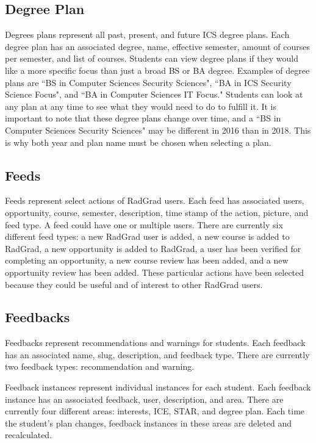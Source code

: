 \subsection{Degree Plan}
Degrees plans represent all past, present, and future ICS degree plans. Each degree plan has an associated degree, name, effective semester, amount of courses per semester, and list of courses. Students can view degree plans if they would like a more specific focus than just a broad BS or BA degree. Examples of degree plans are ``BS in Computer Sciences Security Sciences", ``BA in ICS Security Science Focus", and ``BA in Computer Sciences IT Focus." Students can look at any plan at any time to see what they would need to do to fulfill it. It is important to note that these degree plans change over time, and a ``BS in Computer Sciences Security Sciences" may be different in 2016 than in 2018. This is why both year and plan name must be chosen when selecting a plan.  

\subsection{Feeds}
Feeds represent select actions of RadGrad users. Each feed has associated users, opportunity, course, semester, description, time stamp of the action, picture, and feed type. A feed could have one or multiple users. There are currently six different feed types: a new RadGrad user is added, a new course is added to RadGrad, a new opportunity is added to RadGrad, a user has been verified for completing an opportunity, a new course review has been added, and a new opportunity review has been added. These particular actions have been selected because they could be useful and of interest to other RadGrad users.

\subsection{Feedbacks}
Feedbacks represent recommendations and warnings for students. Each feedback has an associated name, slug, description, and feedback type. There are currently two feedback types: recommendation and warning. 

Feedback instances represent individual instances for each student. Each feedback instance has an associated feedback, user, description, and area. There are currently four different areas: interests, ICE, STAR, and degree plan. Each time the student's plan changes, feedback instances in these areas are deleted and recalculated.

